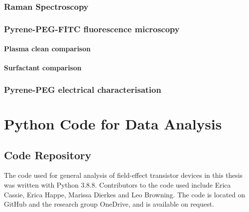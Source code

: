 \documentclass[
  a4paper,
]{scrbook}
\begin{document}
\hypertarget{raman-spectroscopy}{%
\subsection{Raman Spectroscopy}\label{raman-spectroscopy}}

\hypertarget{pyrene-peg-fitc-fluorescence-microscopy}{%
\subsection{Pyrene-PEG-FITC fluorescence
microscopy}\label{pyrene-peg-fitc-fluorescence-microscopy}}

\hypertarget{plasma-clean-comparison}{%
\subsubsection*{Plasma clean comparison}\label{plasma-clean-comparison}}

\hypertarget{surfactant-comparison}{%
\subsubsection*{Surfactant comparison}\label{surfactant-comparison}}

\hypertarget{pyrene-peg-electrical-characterisation}{%
\subsection{Pyrene-PEG electrical
characterisation}\label{pyrene-peg-electrical-characterisation}}

\appendix
{}

\hypertarget{sec-python}{%
\chapter{Python Code for Data Analysis}\label{sec-python}}

\hypertarget{code-repository}{%
\section{Code Repository}\label{code-repository}}

The code used for general analysis of field-effect transistor devices in
this thesis was written with Python 3.8.8. Contributors to the code used
include Erica Cassie, Erica Happe, Marissa Dierkes and Leo Browning. The
code is located on GitHub and the research group OneDrive, and is
available on request.
\end{document}
